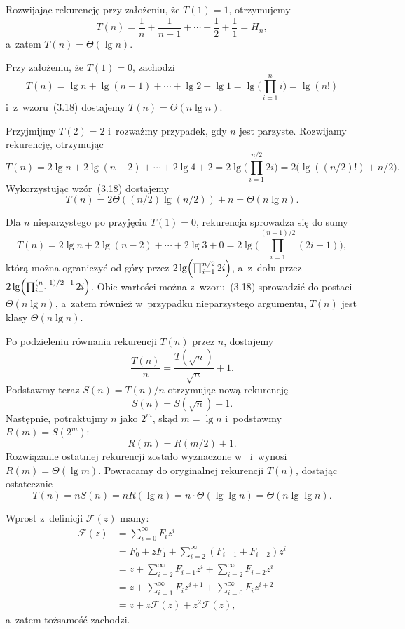 \subproblem %
Rozwijając rekurencję przy założeniu, że $T(1)=1$, otrzymujemy
\[
	T(n) = \frac{1}{n}+\frac{1}{n-1}+\cdots+\frac{1}{2}+\frac{1}{1} = H_n,
\]
a~zatem $T(n)=\Theta(\lg n)$.

\subproblem %
Przy założeniu, że $T(1)=0$, zachodzi
\[
	T(n) = \lg n+\lg(n-1)+\cdots+\lg2+\lg 1 = \lg\biggl(\prod_{i=1}^ni\biggr) = \lg(n!)
\]
i~z~wzoru~(3.18) dostajemy $T(n)=\Theta(n\lg n)$.

\subproblem %
Przyjmijmy $T(2)=2$ i~rozważmy przypadek, gdy $n$ jest parzyste. Rozwijamy rekurencję, otrzymując
\[
	T(n) = 2\lg n+2\lg(n-2)+\cdots+2\lg4+2 = 2\lg\biggl(\prod_{i=1}^{n/2}2i\biggr) = 2\bigl(\lg((n/2)!)+n/2\bigr).
\]
Wykorzystując wzór~(3.18) dostajemy
\[
	T(n) = 2\Theta((n/2)\lg (n/2))+n = \Theta(n\lg n).
\]

Dla $n$ nieparzystego po przyjęciu $T(1)=0$, rekurencja sprowadza się do sumy
\[
	T(n) = 2\lg n+2\lg(n-2)+\cdots+2\lg3+0 = 2\lg\biggl(\prod_{i=1}^{(n-1)/2}(2i-1)\biggr),
\]
którą można ograniczyć od góry przez $2\lg\Bigl(\prod_{i=1}^{n/2}2i\Bigr)$, a~z~dołu przez $2\lg\Bigl(\prod_{i=1}^{(n-1)/2-1}2i\Bigr)$. Obie wartości można z~wzoru~(3.18) sprowadzić do postaci $\Theta(n\lg n)$, a~zatem również w~przypadku nieparzystego argumentu, $T(n)$ jest klasy $\Theta(n\lg n)$.

\subproblem %
Po podzieleniu równania rekurencji $T(n)$ przez $n$, dostajemy
\[
	\frac{T(n)}{n} = \frac{T(\!\sqrt{n})}{\sqrt{n}}+1.
\]
Podstawmy teraz $S(n)=T(n)/n$ otrzymując nową rekurencję
\[
	S(n) = S(\!\sqrt{n})+1.
\]
Następnie, potraktujmy $n$ jako $2^m$, skąd $m=\lg n$ i~podstawmy $R(m)=S(2^m)$:
\[
	R(m) = R(m/2)+1.
\]
Rozwiązanie ostatniej rekurencji zostało wyznaczone w~ i~wynosi $R(m)=\Theta(\lg m)$. Powracamy do oryginalnej rekurencji $T(n)$, dostając ostatecznie
\[
	T(n) = nS(n) = nR(\lg n) = n\cdot\Theta(\lg\lg n) = \Theta(n\lg\lg n).
\]


\subproblem %
Wprost z~definicji $\mathcal{F}(z)$ mamy:
\begin{align*}
	\mathcal{F}(z) &= \sum_{i=0}^\infty F_iz^i \\
	&= F_0+zF_1+\sum_{i=2}^\infty (F_{i-1}+F_{i-2})z^i \\
	&= z+\sum_{i=2}^\infty F_{i-1}z^i+\sum_{i=2}^\infty F_{i-2}z^i \\
	&= z+\sum_{i=1}^\infty F_iz^{i+1}+\sum_{i=0}^\infty F_iz^{i+2} \\[2mm]
	&= z+z\mathcal{F}(z)+z^2\mathcal{F}(z),
\end{align*}
a~zatem tożsamość zachodzi.

